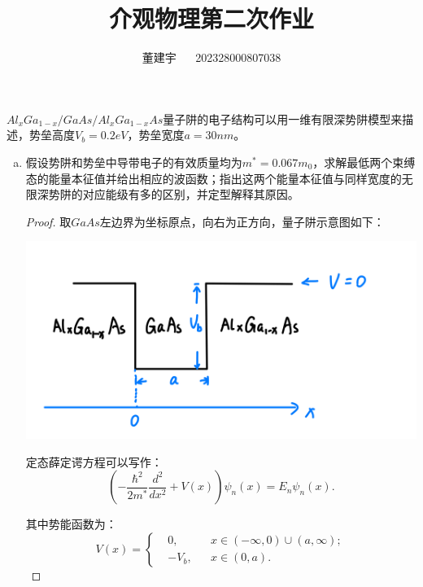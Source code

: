 \documentclass[reqno,a4paper,12pt]{amsart}
\title{介观物理第二次作业}
\author{董建宇 ~~ 202328000807038}
\begin{document}
\maketitle
\titleformat{\section}[hang]{\small}{\thesection}{0.8em}{}{}
\titleformat{\subsection}[hang]{\small}{\thesubsection}{0.8em}{}{}

$Al_xGa_{1-x}/GaAs/Al_xGa_{1-x}As$量子阱的电子结构可以用一维有限深势阱模型来描述，势垒高度$V_b = 0.2eV$，势垒宽度$a=30nm$。

\begin{enumerate}[a)]

\item 假设势阱和势垒中导带电子的有效质量均为$m^* = 0.067m_0$，求解最低两个束缚态的能量本征值并给出相应的波函数；指出这两个能量本征值与同样宽度的无限深势阱的对应能级有多的区别，并定型解释其原因。

\begin{proof}
取$GaAs$左边界为坐标原点，向右为正方向，量子阱示意图如下：

\begin{center}
	\includegraphics[scale = 0.18]{homework02.jpeg}
\end{center}

定态薛定谔方程可以写作：
\[
	\left( -\frac{\hbar^2}{2m^*} \frac{d^2}{dx^2} + V(x) \right) \psi_n(x) = E_n \psi_n(x).
\]

其中势能函数为：
\[
	V(x) = \left\{ \begin{aligned}
		&0, & &x\in (-\infty, 0) \cup (a, \infty); \\
		&-V_b, & &x \in (0,a).
	\end{aligned} \right.
\]


\end{proof}
\end{enumerate}
\end{document}
